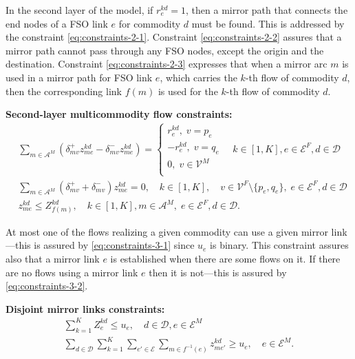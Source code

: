 \documentclass[onecolumn,11pt,draftclsnofoot]{IEEEtran}
\begin{document}
In the second layer of the model, if $r_e^{kd} = 1$, then a mirror path that connects the end nodes of a FSO link $e$ for commodity $d$ must be found. This is addressed by the constraint \eqref{eq:constraints-2-1}.
Constraint \eqref{eq:constraints-2-2} assures that a mirror path cannot pass through any FSO nodes, except the origin and the destination. Constraint \eqref{eq:constraints-2-3} expresses that when a mirror arc $m$ is used in a mirror path for FSO link $e$, which carries the $k$-th flow of commodity $d$, then the corresponding link $f(m)$ is used for the $k$-th flow of commodity $d$.

\noindent \textbf{Second-layer multicommodity flow constraints:}
\begin{subequations}\label{eq:constraints-2}
\begin{align}
& \mbox{$\sum_{m \in  \mathcal A^{M}} (\delta^+_{mv} z_{me}^{kd}- \delta^-_{mv} z_{me}^{kd})$} =
                     \left\{ \begin{array}{l}
                        r_{e}^{kd}, \;  v = p_e\\
                        -r_{e}^{kd}, \;   v = q_e\\
                         0, \;  v \in \mathcal V^M \\
                     \end{array}
             \right. \quad k \in [1,K],  e \in \mathcal E^{F}, d \in \mathcal D \label{eq:constraints-2-1}\\
& \mbox{$\sum_{m \in  \mathcal A^{M}} (\delta^+_{mv} + \delta^-_{mv})  z_{me}^{kd}$} =0, \quad  k \in [1,K], \quad  v \in \mathcal V^F \setminus \{p_e,q_e\}, \; e \in \mathcal E^{F}, d \in \mathcal D \label{eq:constraints-2-2}\\
& \mbox{$z_{me}^{kd}$} \leq Z_{f(m)}^{kd}, \quad  k \in [1,K],  m \in  \mathcal A^{M}, \; e \in \mathcal E^{F}, d \in \mathcal D. \label{eq:constraints-2-3}
\end{align}
\end{subequations}

At most one of the flows realizing a given commodity can use a given mirror link---this is assured by \eqref{eq:constraints-3-1} since $u_e$ is binary. This constraint assures also that a mirror link $e$ is established when there are some flows on it. If there are no flows using a mirror link $e$ then it is not---this is assured by \eqref{eq:constraints-3-2}.

\noindent \textbf{Disjoint mirror links constraints:}
\begin{subequations}\label{eq:constraints-3}
\begin{align}
\mbox{$\sum_{k=1}^K Z_{e}^{kd} \leq u_{e}$}, \quad d \in \mathcal D, e \in \mathcal E^M \label{eq:constraints-3-1}\\
\mbox{$\sum_{d \in \mathcal D} \sum_{k=1}^K  \sum_{e' \in \mathcal E} \sum_{m \in f^{-1}(e)}z_{me'}^{kd} \geq u_{e}$}, \quad e \in \mathcal E^M. \label{eq:constraints-3-2}
\end{align}
\end{subequations}
\end{document}

